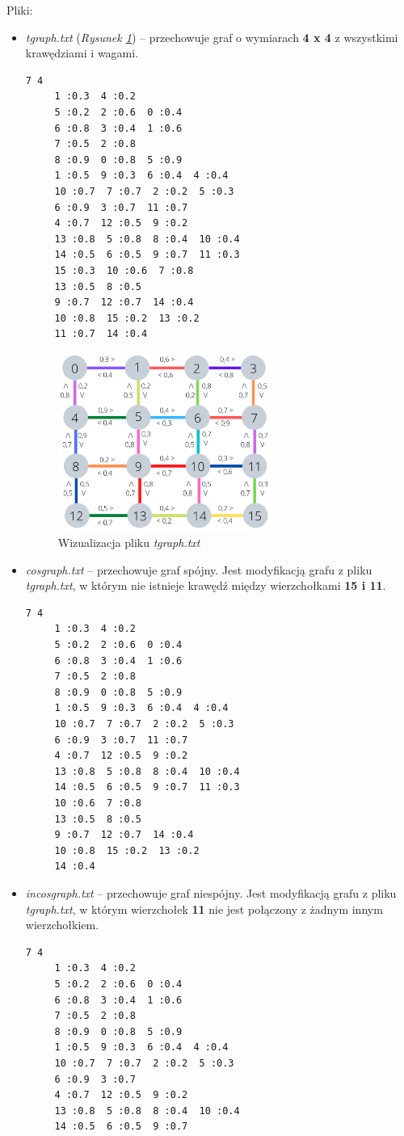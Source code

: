 \documentclass{article}
\begin{document}
\medskip

\noindent Pliki:
\begin{itemize}
    \item \emph{t\textunderscore graph.txt} (\emph{Rysunek \ref{fig:wagi}}) -- przechowuje graf o wymiarach \textbf{4 x 4} z wszystkimi krawędziami i wagami.
\begin{lstlisting}
7 4
	 1 :0.3  4 :0.2 
	 5 :0.2  2 :0.6  0 :0.4 
	 6 :0.8  3 :0.4  1 :0.6
	 7 :0.5  2 :0.8 
	 8 :0.9  0 :0.8  5 :0.9 
	 1 :0.5  9 :0.3  6 :0.4  4 :0.4 
	 10 :0.7  7 :0.7  2 :0.2  5 :0.3 
	 6 :0.9  3 :0.7  11 :0.7 
	 4 :0.7  12 :0.5  9 :0.2 
	 13 :0.8  5 :0.8  8 :0.4  10 :0.4 
	 14 :0.5  6 :0.5  9 :0.7  11 :0.3 
	 15 :0.3  10 :0.6  7 :0.8 
	 13 :0.5  8 :0.5 
	 9 :0.7  12 :0.7  14 :0.4 
	 10 :0.8  15 :0.2  13 :0.2 
	 11 :0.7  14 :0.4 
\end{lstlisting}
\begin{figure}[htp]
    \centering
    \includegraphics[width=7cm]{images/wagi.png}
    \caption{Wizualizacja pliku \emph{t\textunderscore graph.txt}}
    \label{fig:wagi}
\end{figure}
\item \emph{cos\textunderscore graph.txt} -- przechowuje graf spójny. Jest modyfikacją grafu z pliku \emph{t\textunderscore graph.txt}, w którym nie istnieje krawędź między wierzchołkami \textbf{15 i 11}.
\begin{lstlisting}
7 4
	 1 :0.3  4 :0.2 
	 5 :0.2  2 :0.6  0 :0.4 
	 6 :0.8  3 :0.4  1 :0.6
	 7 :0.5  2 :0.8 
	 8 :0.9  0 :0.8  5 :0.9 
	 1 :0.5  9 :0.3  6 :0.4  4 :0.4 
	 10 :0.7  7 :0.7  2 :0.2  5 :0.3 
	 6 :0.9  3 :0.7  11 :0.7 
	 4 :0.7  12 :0.5  9 :0.2 
	 13 :0.8  5 :0.8  8 :0.4  10 :0.4 
	 14 :0.5  6 :0.5  9 :0.7  11 :0.3 
	 10 :0.6  7 :0.8 
	 13 :0.5  8 :0.5 
	 9 :0.7  12 :0.7  14 :0.4 
	 10 :0.8  15 :0.2  13 :0.2 
	 14 :0.4 
\end{lstlisting}
\item \emph{incos\textunderscore graph.txt} -- przechowuje graf niespójny. Jest modyfikacją grafu z pliku \emph{t\textunderscore graph.txt}, w którym wierzchołek \textbf{11} nie jest połączony z żadnym innym wierzchołkiem.
\begin{lstlisting}
7 4
	 1 :0.3  4 :0.2 
	 5 :0.2  2 :0.6  0 :0.4 
	 6 :0.8  3 :0.4  1 :0.6
	 7 :0.5  2 :0.8 
	 8 :0.9  0 :0.8  5 :0.9 
	 1 :0.5  9 :0.3  6 :0.4  4 :0.4 
	 10 :0.7  7 :0.7  2 :0.2  5 :0.3 
	 6 :0.9  3 :0.7  
	 4 :0.7  12 :0.5  9 :0.2 
	 13 :0.8  5 :0.8  8 :0.4  10 :0.4 
	 14 :0.5  6 :0.5  9 :0.7   
	  

\end{lstlisting}
\end{itemize}
\end{document}
